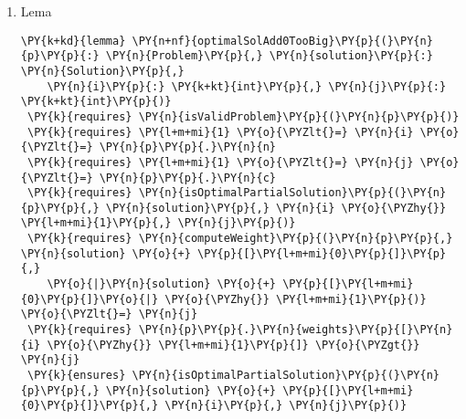 \begin{sloppypar}
\begin{enumerate}
\begin{Verbatim}[commandchars=\\\{\}]
      \PY{k}{assert} \PY{n}{gain}\PY{p}{(}\PY{n}{p}\PY{p}{,} \PY{n}{x}\PY{p}{)} \PY{o}{==} \PY{n}{gain}\PY{p}{(}\PY{n}{p}\PY{p}{,} \PY{n}{x1}\PY{p}{)} \PY{o}{+} 
        \PY{n}{p}\PY{p}{.}\PY{n}{gains}\PY{p}{[}\PY{n}{i} \PY{o}{\PYZhy{}} \PY{l+m+mi}{1}\PY{p}{]} \PY{o}{\PYZlt{}=} \PY{n}{gain}\PY{p}{(}\PY{n}{p}\PY{p}{,} \PY{n}{solution2} \PY{o}{+} \PY{p}{[}\PY{l+m+mi}{0}\PY{p}{]}\PY{p}{)}\PY{p}{;}
      \PY{k}{assert} \PY{k+kc}{false}\PY{p}{;}
    \PY{p}{\PYZcb{}}
    \PY{k}{assert} \PY{n}{x}\PY{p}{[}\PY{n}{i} \PY{o}{\PYZhy{}} \PY{l+m+mi}{1}\PY{p}{]} \PY{o}{==} \PY{l+m+mi}{0}\PY{p}{;}
    \PY{n}{gainAdd0Optimal}\PY{p}{(}\PY{n}{p}\PY{p}{,} \PY{n}{profit1}\PY{p}{,} \PY{n}{profit2}\PY{p}{,} \PY{n}{solution1}\PY{p}{,} 
        \PY{n}{solution2}\PY{p}{,} \PY{n}{x}\PY{p}{,} \PY{n}{i}\PY{p}{,} \PY{n}{j}\PY{p}{)}\PY{p}{;}
    \PY{k}{assert} \PY{n}{gain}\PY{p}{(}\PY{n}{p}\PY{p}{,} \PY{n}{x}\PY{p}{)} \PY{o}{==} \PY{n}{gain}\PY{p}{(}\PY{n}{p}\PY{p}{,} \PY{n}{solution2} \PY{o}{+} \PY{p}{[}\PY{l+m+mi}{0}\PY{p}{]}\PY{p}{)}\PY{p}{;}
  \PY{p}{\PYZcb{}}
\PY{p}{\PYZcb{}}
\end{Verbatim}
     \item Lema 
     \begin{Verbatim}[commandchars=\\\{\}]
\PY{k+kd}{lemma} \PY{n+nf}{optimalSolAdd0TooBig}\PY{p}{(}\PY{n}{p}\PY{p}{:} \PY{n}{Problem}\PY{p}{,} \PY{n}{solution}\PY{p}{:} \PY{n}{Solution}\PY{p}{,} 
    \PY{n}{i}\PY{p}{:} \PY{k+kt}{int}\PY{p}{,} \PY{n}{j}\PY{p}{:} \PY{k+kt}{int}\PY{p}{)}
 \PY{k}{requires} \PY{n}{isValidProblem}\PY{p}{(}\PY{n}{p}\PY{p}{)}
 \PY{k}{requires} \PY{l+m+mi}{1} \PY{o}{\PYZlt{}=} \PY{n}{i} \PY{o}{\PYZlt{}=} \PY{n}{p}\PY{p}{.}\PY{n}{n}
 \PY{k}{requires} \PY{l+m+mi}{1} \PY{o}{\PYZlt{}=} \PY{n}{j} \PY{o}{\PYZlt{}=} \PY{n}{p}\PY{p}{.}\PY{n}{c}
 \PY{k}{requires} \PY{n}{isOptimalPartialSolution}\PY{p}{(}\PY{n}{p}\PY{p}{,} \PY{n}{solution}\PY{p}{,} \PY{n}{i} \PY{o}{\PYZhy{}} \PY{l+m+mi}{1}\PY{p}{,} \PY{n}{j}\PY{p}{)}
 \PY{k}{requires} \PY{n}{computeWeight}\PY{p}{(}\PY{n}{p}\PY{p}{,} \PY{n}{solution} \PY{o}{+} \PY{p}{[}\PY{l+m+mi}{0}\PY{p}{]}\PY{p}{,} 
    \PY{o}{|}\PY{n}{solution} \PY{o}{+} \PY{p}{[}\PY{l+m+mi}{0}\PY{p}{]}\PY{o}{|} \PY{o}{\PYZhy{}} \PY{l+m+mi}{1}\PY{p}{)} \PY{o}{\PYZlt{}=} \PY{n}{j} 
 \PY{k}{requires} \PY{n}{p}\PY{p}{.}\PY{n}{weights}\PY{p}{[}\PY{n}{i} \PY{o}{\PYZhy{}} \PY{l+m+mi}{1}\PY{p}{]} \PY{o}{\PYZgt{}} \PY{n}{j}
 \PY{k}{ensures} \PY{n}{isOptimalPartialSolution}\PY{p}{(}\PY{n}{p}\PY{p}{,} \PY{n}{solution} \PY{o}{+} \PY{p}{[}\PY{l+m+mi}{0}\PY{p}{]}\PY{p}{,} \PY{n}{i}\PY{p}{,} \PY{n}{j}\PY{p}{)}

\end{Verbatim}
\end{enumerate}
\end{sloppypar}
